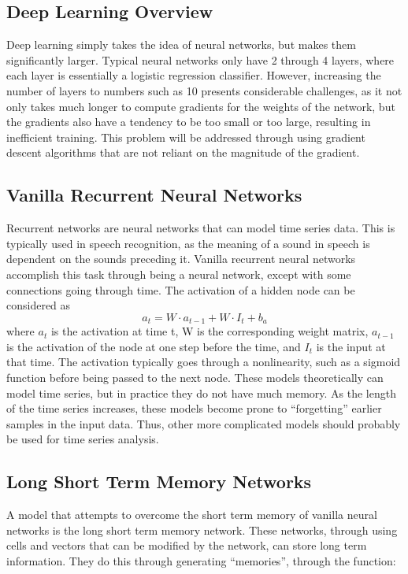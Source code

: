 \documentclass{article}
\begin{document}
\subsection{Deep Learning Overview}
Deep learning simply takes the idea of neural networks, but makes them
significantly larger. Typical neural networks only have 2 through 4 layers,
where each layer is essentially a logistic regression classifier. However,
increasing the number of layers to numbers such as 10 presents considerable
challenges, as it not only takes much longer to compute gradients for the
weights of the network, but the gradients also have a tendency to be too small
or too large, resulting in inefficient training. This problem will be addressed
through using gradient descent algorithms that are not reliant on the magnitude
of the gradient.


\subsection{Vanilla Recurrent Neural Networks}
Recurrent networks are neural networks that can model time series data. This is
typically used in speech recognition, as the meaning of a sound in speech is
dependent on the sounds preceding it. Vanilla recurrent neural networks
accomplish this task through being a neural network, except with some
connections going through time.  The activation of a hidden node can be
considered as $$a_t = W\cdot a_{t-1} + W\cdot I_t + b_a$$ where $a_t$ is the
activation at time t, W is the corresponding weight matrix, $a_{t-1}$ is the
activation of the node at one step before the time, and $I_t$ is the input at
that time. The activation typically goes through a nonlinearity, such as a
sigmoid function before being passed to the next node. These models
theoretically can model time series, but in practice they do not have much
memory. As the length of the time series increases, these models become prone to
``forgetting'' earlier samples in the input data. Thus, other more complicated
models should probably be used for time series analysis.

\subsection{Long Short Term Memory Networks}
A model that attempts to overcome the short term memory of vanilla neural
networks is the long short term memory network. These networks, through using
cells and vectors that can be modified by the network, can store long term
information. They do this through generating ``memories'', through the function:
\end{document}

